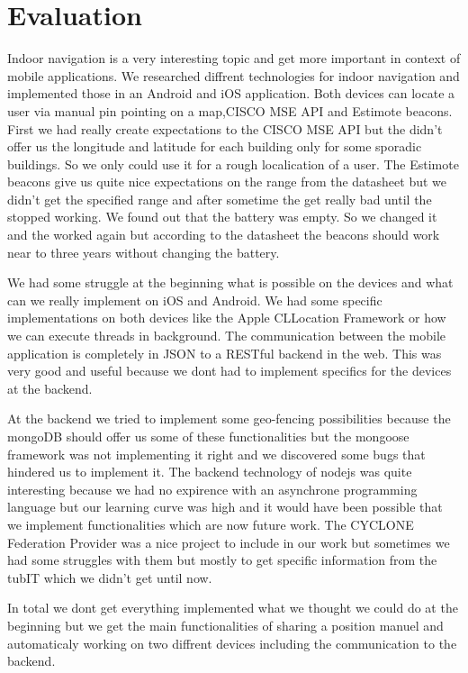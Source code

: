 \chapter{Evaluation}
\label{cha:evaluation}

Indoor navigation is a very interesting topic and get more important in context of mobile applications. We researched diffrent technologies for indoor navigation and implemented those in an Android and iOS application. Both devices can locate a user via manual pin pointing on a map,CISCO MSE API and Estimote beacons. First we had really create expectations to the CISCO MSE API but the didn't offer us the longitude and latitude for each building only for some sporadic buildings. So we only could use it for a rough localication of a user. The Estimote beacons give us quite nice expectations on the range from the datasheet but we didn't get the specified range and after sometime the get really bad until the stopped working. We found out that the battery was empty. So we changed it and the worked again but according to the datasheet the beacons should work near to three years without changing the battery.

We had some struggle at the beginning what is possible on the devices and what can we really implement on iOS and Android. We had some specific implementations on both devices like the Apple CLLocation Framework or how we can execute threads in background. The communication between the mobile application is completely in JSON to a RESTful backend in the web. This was very good and useful because we dont had to implement specifics for the devices at the backend.

At the backend we tried to implement some geo-fencing possibilities because the mongoDB should offer us some of these functionalities but the mongoose framework was not implementing it right and we discovered some bugs that hindered us to implement it. The backend technology of nodejs was quite interesting because we had no expirence with an asynchrone programming language but our learning curve was high and it would have been possible that we implement functionalities which are now future work. The CYCLONE Federation Provider was a nice project to include in our work but sometimes we had some struggles with them but mostly to get specific information from the tubIT which we didn't get until now.

In total we dont get everything implemented what we thought we could do at the beginning but we get the main functionalities of sharing a position manuel and automaticaly working on two diffrent devices including the communication to the backend.

